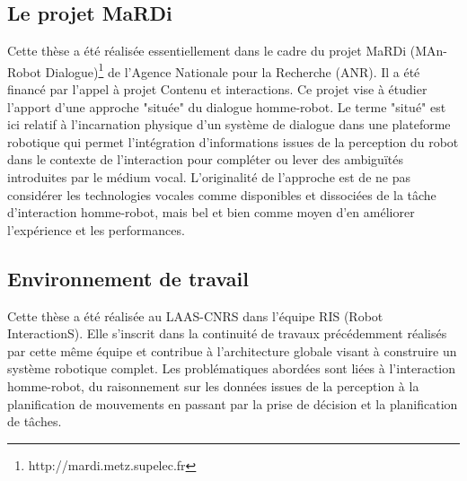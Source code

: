 \documentclass[a4paper,11pt,twoside]{StyleThese}
\begin{document}
\subsection{Le projet MaRDi}
Cette thèse a été réalisée essentiellement dans le cadre du projet MaRDi (MAn-Robot Dialogue)\footnote{http://mardi.metz.supelec.fr} de l’Agence Nationale pour la Recherche (ANR). Il a été financé par l’appel à projet Contenu et interactions.
Ce projet vise à étudier l’apport d’une approche "située" du dialogue homme-robot. Le terme "situé" est ici relatif à l’incarnation physique d’un système de dialogue dans une plateforme robotique qui permet l’intégration d’informations issues de la perception du robot dans le contexte de l’interaction pour compléter ou lever des ambiguïtés introduites par le médium vocal. L’originalité de l’approche est de ne pas considérer les technologies vocales comme disponibles et dissociées de la tâche d’interaction homme-robot, mais bel et bien comme moyen d’en améliorer l’expérience et les performances.

\subsection{Environnement de travail}
\label{sec:workEnv}
Cette thèse a été réalisée au LAAS-CNRS dans l'équipe RIS (Robot InteractionS).
Elle s'inscrit dans la continuité de travaux précédemment réalisés par cette même équipe et contribue à l'architecture globale visant à construire un système robotique complet. Les problématiques abordées sont liées à l'interaction homme-robot, du raisonnement sur les données issues de la perception à la planification de mouvements en passant par la prise de décision et la planification de tâches.
\end{document}
